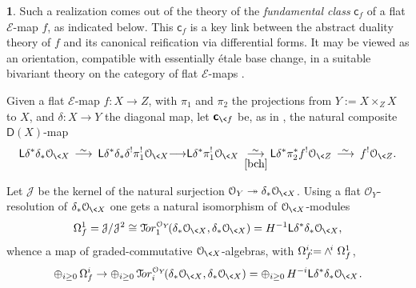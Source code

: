 \documentclass{compositio}
\theoremstyle{plain}
\theoremstyle{definition}
\newtheorem{cosa}[thm]{}
\theoremstyle{remark}
\numberwithin{equation}{thm}
\begin{document}
\begin{cosa}
Such a realization  comes out of the theory of the \emph{fundamental class}
${{\boldsymbol{\mathsf{c}}}_{{f}}}$  of a flat ${\mathscr{E}}$-map $f$, as indicated below. This ${{\boldsymbol{\mathsf{c}}}_{{f}}}$   is a key link between the abstract duality theory of $f$ and its canonical reification via differential forms. It may be viewed as an orientation, compatible with essentially 
\'etale base change, in a suitable bivariant theory on the category of flat ${\mathscr{E}}$-maps \cite{AJL4}.{\vspace{2pt}}

Given a flat ${\mathscr{E}}$-map $f\colon X\to Z$, with $\pi_1$ and $\pi_2$ the projections from $Y{\!:=} X\times_Z X$ to $X$, and $\delta\colon X\to Y$  the diagonal map,
let ${{\boldsymbol{\mathsf{c}}}_{{\<f}}}$ be, as in \cite[Example 2.3]{AJL4}, the natural composite ${\boldsymbol{\mathsf{D}}}(X)$-map{\vspace{4pt}}
\begin{equation}\label{fclass}
{\mathsf L}\delta^*\delta_*{\mathcal O_{{\mkern-1mu}\<X}}{{\mkern8mu\longrightarrow \mkern-25.5mu{}^\sim\mkern17mu}} {\mathsf L}\delta^*\delta_*\delta^!\pi_1^!{\mathcal O_{{\mkern-1mu}\<X}}{\longrightarrow}{\mathsf L}\delta^*\pi_1^!{\mathcal O_{{\mkern-1mu}\<X}}\;
\underset{\eqref{bch}}{{\mkern8mu\longrightarrow \mkern-25.5mu{}^\sim\mkern17mu}}
{\mathsf L}\delta^*\pi_2^*f^!{\mathcal O_{\<Z}}{{\mkern8mu\longrightarrow \mkern-25.5mu{}^\sim\mkern17mu}} f^!{\mathcal O_{\<Z}}.
\end{equation}

Let $\mathcal J$ be the kernel of the natural surjection ${\mathcal O_Y}\twoheadrightarrow \delta_*{\mathcal O_{{\mkern-1mu}\<X}}$.
Using a flat ${\mathcal O_Y}$-resolution of $\delta_*{\mathcal O_{{\mkern-1mu}\<X}}$ one gets a natural isomorphism of ${\mathcal O_{{\mkern-1mu}\<X}}$-modules
$$
\Omega^1_f=
\mathcal J/{\mkern1mu}\mathcal J^{{\mkern1mu}2}\cong \mathcal T\!or_1^{\mathcal O_Y}\!(\delta_*{\mathcal O_{{\mkern-1mu}\<X}},\delta_*{\mathcal O_{{\mkern-1mu}\<X}})=H^{-1}{\mathsf L}\delta^*\delta_*{\mathcal O_{{\mkern-1mu}\<X}},
$$
whence a map of graded-commutative ${\mathcal O_{{\mkern-1mu}\<X}}$-algebras, with $\Omega^i_f{\!:=} \wedge^{\!i}\mkern1.5mu \Omega^1_f{\mkern1mu}$,
\begin{equation}\label{Omega and H}
\oplus_{i\ge 0} \,\Omega^i_f \to\oplus_{i\ge 0}\,\mathcal T\!or_i^{\mathcal O_Y}\!(\delta_*{\mathcal O_{{\mkern-1mu}\<X}},\delta_*{\mathcal O_{{\mkern-1mu}\<X}})
=\oplus_{i\ge 0}\,H^{-i}{\mathsf L}\delta^*\delta_*{\mathcal O_{{\mkern-1mu}\<X}}{\mkern1mu}.
\end{equation}


\end{cosa}
\end{document}
